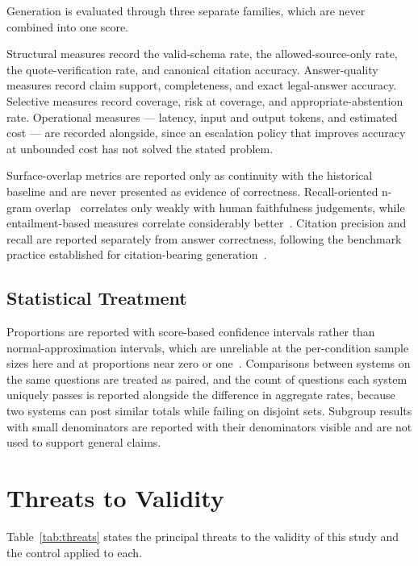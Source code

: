 Generation is evaluated through three separate families, which are never combined into one score.

Structural measures record the valid-schema rate, the allowed-source-only rate, the quote-verification rate, and canonical citation accuracy. Answer-quality measures record claim support, completeness, and exact legal-answer accuracy. Selective measures record coverage, risk at coverage, and appropriate-abstention rate. Operational measures --- latency, input and output tokens, and estimated cost --- are recorded alongside, since an escalation policy that improves accuracy at unbounded cost has not solved the stated problem.

Surface-overlap metrics are reported only as continuity with the historical baseline and are never presented as evidence of correctness. Recall-oriented n-gram overlap~\cite{lin2004rouge} correlates only weakly with human faithfulness judgements, while entailment-based measures correlate considerably better~\cite{maynez2020faithfulness}. Citation precision and recall are reported separately from answer correctness, following the benchmark practice established for citation-bearing generation~\cite{gao2023alce}.

\subsection{Statistical Treatment}

Proportions are reported with score-based confidence intervals rather than normal-approximation intervals, which are unreliable at the per-condition sample sizes here and at proportions near zero or one~\cite{wilson1927probable}. Comparisons between systems on the same questions are treated as paired, and the count of questions each system uniquely passes is reported alongside the difference in aggregate rates, because two systems can post similar totals while failing on disjoint sets. Subgroup results with small denominators are reported with their denominators visible and are not used to support general claims.

\section{Threats to Validity}
\label{sec:method-threats}

Table~\ref{tab:threats} states the principal threats to the validity of this study and the control applied to each.

